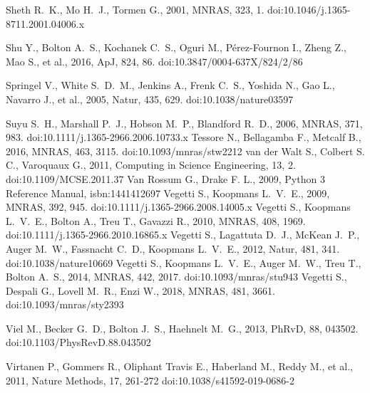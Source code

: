 \documentclass[a4paper, fleqn, usenatbib, useAMS]{mnras}
\begin{document}
\begin{thebibliography}{99}
 Sheth R.~K., Mo H.~J., Tormen G., 2001, MNRAS, 323, 1. doi:10.1046/j.1365-8711.2001.04006.x


 Shu Y., Bolton A.~S., Kochanek C.~S., Oguri M., P{\'e}rez-Fournon I., Zheng Z., Mao S., et al., 2016, ApJ, 824, 86. doi:10.3847/0004-637X/824/2/86

 Springel V., White S.~D.~M., Jenkins A., Frenk C.~S., Yoshida N., Gao L., Navarro J., et al., 2005, Natur, 435, 629. doi:10.1038/nature03597

 Suyu S.~H., Marshall P.~J., Hobson M.~P., Blandford R.~D., 2006, MNRAS, 371, 983. doi:10.1111/j.1365-2966.2006.10733.x
 Tessore N., Bellagamba F., Metcalf B., 2016, MNRAS, 463, 3115. doi:10.1093/mnras/stw2212
 van der Walt S., Colbert S. C., Varoquaux G., 2011, Computing in Science Engineering, 13, 2. doi:10.1109/MCSE.2011.37
 Van Rossum G., Drake F. L., 2009, Python 3 Reference Manual, isbn:1441412697
 Vegetti S., Koopmans L.~V.~E., 2009, MNRAS, 392, 945. doi:10.1111/j.1365-2966.2008.14005.x
 Vegetti S., Koopmans L.~V.~E., Bolton A., Treu T., Gavazzi R., 2010, MNRAS, 408, 1969. doi:10.1111/j.1365-2966.2010.16865.x
 Vegetti S., Lagattuta D.~J., McKean J.~P., Auger M.~W., Fassnacht C.~D., Koopmans L.~V.~E., 2012, Natur, 481, 341. doi:10.1038/nature10669
 Vegetti S., Koopmans L.~V.~E., Auger M.~W., Treu T., Bolton A.~S., 2014, MNRAS, 442, 2017. doi:10.1093/mnras/stu943
 Vegetti S., Despali G., Lovell M.~R., Enzi W., 2018, MNRAS, 481, 3661. doi:10.1093/mnras/sty2393

 Viel M., Becker G.~D., Bolton J.~S., Haehnelt M.~G., 2013, PhRvD, 88, 043502. doi:10.1103/PhysRevD.88.043502

 Virtanen P., Gommers R., Oliphant Travis E., Haberland M., Reddy M., et al., 2011, Nature Methods, 17, 261-272 doi:10.1038/s41592-019-0686-2


\end{thebibliography}
\end{document}
